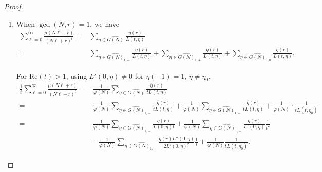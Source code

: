 \documentclass[10pt,a4paper]{amsart}
\begin{document}
\begin{proof}
\begin{enumerate}[label= \roman*)]
Then the constant term of the full series is
\begin{equation*}
\frac{\mu(d)}{\varphi\left( \frac{N}{d} \right)} \sum_{\eta \in \widehat{G\left( \frac{N}{d} \right)}} \overline{\eta}\left( \frac{r}{d} \right) \sum_{-\frak{o}_\eta \leq j \leq \omega(d)} \frak{b}_{-j}(d; \eta; \mathbf{p}) \cdot \frak{l}_j(\eta),
\end{equation*}
which equals $\mathscr{R}_{N,r}$ by definition.\\





\item When $\gcd(N,r)=1$, we have
\[
\begin{split}
\sum_{\ell=0}^\infty \frac{\mu(N\ell + r)}{(N\ell + r)^t}
=& \sum_{\eta \in \widehat{G(N)}} \frac{\overline{\eta}(r)}{L(t,\eta)}\\
=& \sum_{\eta \in \widehat{G(N)}_{1,-}} \frac{\overline{\eta}(r)}{L(t,\eta)}
+ \sum_{\eta \in \widehat{G(N)}_{1,+}} \frac{\overline{\eta}(r)}{L(t,\eta)}
+ \sum_{\eta \in \widehat{G(N)}_{1,0}} \frac{\overline{\eta}(r)}{L(t,\eta)}.
\end{split}
\]


For $\mathrm{Re}(t) > 1$, using $L'(0,\eta) \ne 0$ for $\eta(-1) = 1$, $\eta \ne \eta_0$,
\begin{align*}
\frac{1}{t} \sum_{\ell=0}^\infty \frac{\mu(N\ell + r)}{(N\ell + r)^t}
=& \frac{1}{\varphi(N)} \sum_{\eta \in \widehat{G(N)}} \frac{\overline{\eta}(r)}{t L(t,\eta)} \\
=& \frac{1}{\varphi(N)} \sum_{\eta \in \widehat{G(N)}_{1,-}} \frac{\overline{\eta}(r)}{t L(t,\eta)}
+ \frac{1}{\varphi(N)} \sum_{\eta \in \widehat{G(N)}_{1,+}} \frac{\overline{\eta}(r)}{t L(t,\eta)}
+ \frac{1}{\varphi(N)} \cdot \frac{1}{t L(t,\eta_0)} \\
=& \frac{1}{\varphi(N)} \sum_{\eta \in \widehat{G(N)}_{1,-}} \frac{\overline{\eta}(r)}{L(0,\eta) t}
+ \frac{1}{\varphi(N)} \sum_{\eta \in \widehat{G(N)}_{1,+}} \frac{\overline{\eta}(r)}{L'(0,\eta)}  \frac{1}{t^2}
\\
&- \frac{1}{\varphi(N)} \sum_{\eta \in \widehat{G(N)}_{1,+}} \frac{\overline{\eta}(r) L''(0,\eta)}{2 L'(0,\eta)^2}  \frac{1}{t}  + \frac{1}{\varphi(N)}  \frac{1}{t L(t,\eta_0)}.
\end{align*}



\end{enumerate}
\end{proof}
\end{document}
